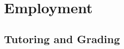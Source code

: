 \documentclass[11pt,a4paper,sans]{moderncv}        %
\begin{document}
\makecvtitle
\vspace*{-1.5cm}

\section{Employment}



\subsection{Tutoring and Grading}
\end{document}
